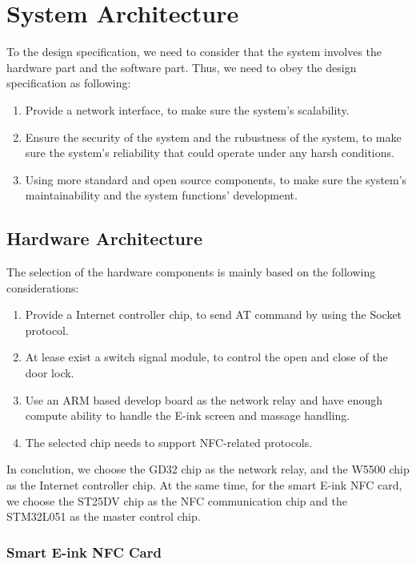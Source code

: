 \documentclass[11pt, a4paper]{article}
\begin{document}
\section{System Architecture}
To the design specification, we need to consider that the system involves the hardware part and the software part.
Thus, we need to obey the design specification as following:

\begin{enumerate}[1.]
    \item Provide a network interface, to make sure the system's scalability.
    \item Ensure the security of the system and the rubustness of the system, to make sure the system's reliability that could operate under any harsh conditions.
    \item Using more standard and open source components, to make sure the system's maintainability and the system functions' development.
\end{enumerate}


\subsection{Hardware Architecture}

The selection of the hardware components is mainly based on the following considerations:

\begin{enumerate}[1.]
    \item Provide a Internet controller chip, to send AT command by using the Socket protocol.
    \item At lease exist a switch signal module, to control the open and close of the door lock.
    \item Use an ARM based develop board as the network relay and have enough compute ability to handle the E-ink screen and massage handling.
    \item The selected chip needs to support NFC-related protocols.
\end{enumerate}

In conclution, we choose the GD32 chip as the network relay, and the W5500 chip as the Internet controller chip.
At the same time, for the smart E-ink NFC card, we choose the ST25DV chip as the NFC communication chip and the STM32L051 as the master control chip.

\subsubsection{Smart E-ink NFC Card}
\end{document}
